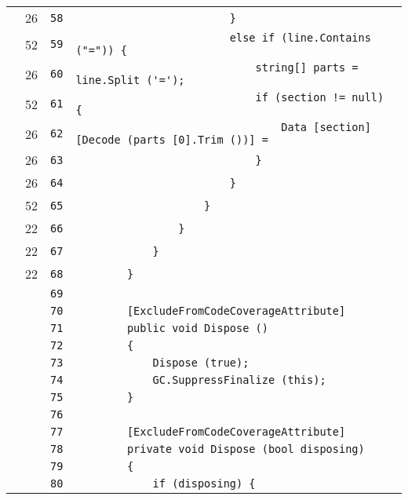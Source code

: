 \documentclass[a4paper,10pt]{article}
\begin{document}
\begin{longtable}[l]{lrrl}
\cellcolor{green} & 26 & \verb~58~ & \verb~                        }~\\
\cellcolor{green} & 52 & \verb~59~ & \verb~                        else if (line.Contains ("=")) {~\\
\cellcolor{green} & 26 & \verb~60~ & \verb~                            string[] parts = line.Split ('=');~\\
\cellcolor{green} & 52 & \verb~61~ & \verb~                            if (section != null) {~\\
\cellcolor{green} & 26 & \verb~62~ & \verb~                                Data [section] [Decode (parts [0].Trim ())] = ~\\
\cellcolor{green} & 26 & \verb~63~ & \verb~                            }~\\
\cellcolor{green} & 26 & \verb~64~ & \verb~                        }~\\
\cellcolor{green} & 52 & \verb~65~ & \verb~                    }~\\
\cellcolor{green} & 22 & \verb~66~ & \verb~                }~\\
\cellcolor{green} & 22 & \verb~67~ & \verb~            }~\\
\cellcolor{green} & 22 & \verb~68~ & \verb~        }~\\
\cellcolor{gray} &  & \verb~69~ & \verb~~\\
\cellcolor{gray} &  & \verb~70~ & \verb~        [ExcludeFromCodeCoverageAttribute]~\\
\cellcolor{gray} &  & \verb~71~ & \verb~        public void Dispose ()~\\
\cellcolor{gray} &  & \verb~72~ & \verb~        {~\\
\cellcolor{gray} &  & \verb~73~ & \verb~            Dispose (true);~\\
\cellcolor{gray} &  & \verb~74~ & \verb~            GC.SuppressFinalize (this);~\\
\cellcolor{gray} &  & \verb~75~ & \verb~        }~\\
\cellcolor{gray} &  & \verb~76~ & \verb~~\\
\cellcolor{gray} &  & \verb~77~ & \verb~        [ExcludeFromCodeCoverageAttribute]~\\
\cellcolor{gray} &  & \verb~78~ & \verb~        private void Dispose (bool disposing)~\\
\cellcolor{gray} &  & \verb~79~ & \verb~        {~\\
\cellcolor{gray} &  & \verb~80~ & \verb~            if (disposing) {~\\

\end{longtable}
\end{document}
